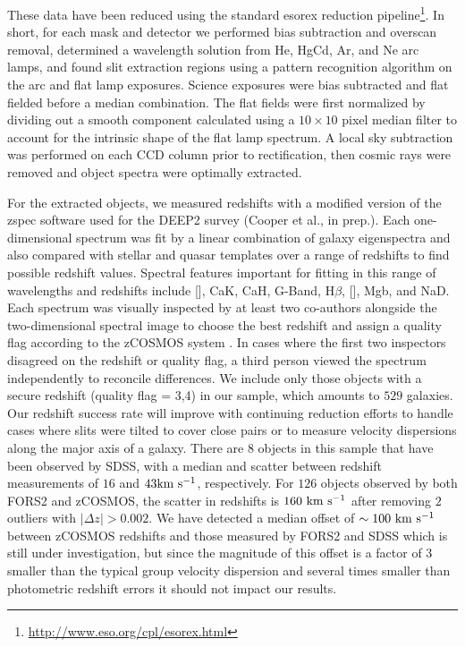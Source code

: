 These data have been reduced using the standard {\sc esorex} reduction
pipeline\footnote{\url{http://www.eso.org/cpl/esorex.html}}. In short, for
each mask and detector we performed bias subtraction and overscan
removal, determined a wavelength solution from He, HgCd, Ar, and Ne arc
lamps, and found slit extraction regions using a pattern recognition
algorithm on the arc and flat lamp exposures. Science exposures were
bias subtracted and flat fielded before a median combination. The flat
fields were first normalized by dividing out a smooth component
calculated using a $10\times10$ pixel median filter to account for the
intrinsic shape of the flat lamp spectrum. A local sky subtraction was
performed on each CCD column prior to rectification, then cosmic rays
were removed and object spectra were optimally extracted. 

For the extracted objects, we measured redshifts with a modified
version of the {\sc zspec} software used for the DEEP2 survey (Cooper
et al., in prep.). Each one-dimensional spectrum was fit by a linear
combination of galaxy eigenspectra and also compared with stellar and
quasar templates over a range of redshifts to find possible redshift
values. Spectral features important for fitting in this range of
wavelengths and redshifts include [], CaK, CaH, G-Band,
H$\beta$, [], Mgb, and NaD. Each spectrum was visually
inspected by at least two co-authors alongside the two-dimensional spectral image to choose the
best redshift and assign a quality flag according to the zCOSMOS
system \citep{Lilly2007}. In cases where the first two inspectors
disagreed on the redshift or quality flag, a third person viewed the
spectrum independently to reconcile differences. We
include only those objects with a secure redshift (quality flag = 3,4)
in our sample, which amounts to $529$ galaxies. Our redshift success
rate will improve with continuing reduction efforts to handle cases
where slits were tilted to cover close pairs or to measure
velocity dispersions along the major axis of a galaxy. There are $8$
objects in this sample that have been observed by SDSS, with a median
and scatter between redshift measurements of $16$ and $43
\rm{km~s^{-1}}$, respectively. For $126$ objects observed by both
FORS2 and zCOSMOS, the scatter in redshifts is $160~{\rm km~s^{-1}}$
after removing $2$ outliers with $|\Delta z|>0.002$. We have detected
a median offset of $\sim100~{\rm km~s^{-1}}$ between zCOSMOS redshifts
and those measured by FORS2 and SDSS which is still under
investigation, but since the magnitude of this offset is a factor of 3
smaller than the typical group velocity dispersion and several times
smaller than photometric redshift errors it should not impact our results.


